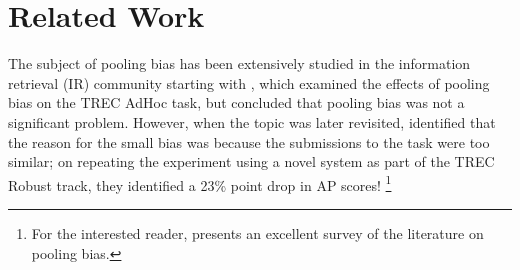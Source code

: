 \section{Related Work}
\label{sec:related}

The subject of pooling bias has been extensively studied in the information retrieval (IR) community starting with \citet{zobel1998reliable}, which examined the effects of pooling bias on the TREC AdHoc task, but concluded that pooling bias was not a significant problem. %
However, when the topic was later revisited,
\citet{buckley2007bias} identified that the reason for the small bias was because the submissions to the task were too similar; on repeating the experiment using a novel system as part of the TREC Robust track, they identified a 23\% point drop in AP scores!%
\footnote{For the interested reader, \citet{weber2010measurement} presents an excellent survey of the literature on pooling bias.}

